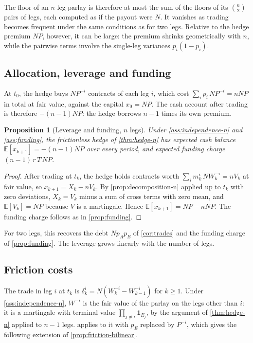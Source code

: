 \documentclass[11pt,a4paper]{article}
\theoremstyle{plain}
\newtheorem{proposition}[theorem]{Proposition}
\theoremstyle{definition}
\theoremstyle{remark}
\newcommand{\E}{\mathbb{E}}
\newcommand{\1}{\mathbf{1}}
\begin{document}
The floor of an $n$-leg parlay is therefore at most the sum of the floors of its $\binom{n}{2}$ pairs of legs, each computed as if the payout were $N$. It vanishes as trading becomes frequent under the same conditions as for two legs. Relative to the hedge premium $NP$, however, it can be large: the premium shrinks geometrically with $n$, while the pairwise terms involve the single-leg variances $p_i(1-p_i)$.

\subsection{Allocation, leverage and funding}

At $t_0$, the hedge buys $NP^{-i}$ contracts of each leg $i$, which cost $\sum_ip_i\,NP^{-i} = nNP$ in total at fair value, against the capital $x_0 = NP$. The cash account after trading is therefore $-(n-1)NP$: the hedge borrows $n-1$ times its own premium.

\begin{proposition}[Leverage and funding, $n$ legs]
\label{prop:funding-n}
Under \cref{ass:independence-n} and \cref{ass:funding}, the frictionless hedge of \cref{thm:hedge-n} has expected cash balance $\E[x_{k+1}] = -(n-1)NP$ over every period, and expected funding charge $(n-1)\,r\,T\,NP$.
\end{proposition}

\begin{proof}
After trading at $t_k$, the hedge holds contracts worth $\sum_i m^i_k\,NW^{-i}_k = nV_k$ at fair value, so $x_{k+1} = X_k - nV_k$. By \cref{prop:decomposition-n} applied up to $t_k$ with zero deviations, $X_k = V_k$ minus a sum of cross terms with zero mean, and $\E[V_k] = NP$ because $V$ is a martingale. Hence $\E[x_{k+1}] = NP - nNP$. The funding charge follows as in \cref{prop:funding}.
\end{proof}

For two legs, this recovers the debt $Np_Ap_B$ of \cref{cor:trades} and the funding charge of \cref{prop:funding}. The leverage grows linearly with the number of legs.

\subsection{Friction costs}

The trade in leg $i$ at $t_k$ is $\delta^i_k = N(W^{-i}_k - W^{-i}_{k-1})$ for $k\geq 1$. Under \cref{ass:independence-n}, $W^{-i}$ is the fair value of the parlay on the legs other than $i$: it is a martingale with terminal value $\prod_{j\neq i}\1_{E_j}$, by the argument of \cref{thm:hedge-n} applied to $n-1$ legs.  applies to it with $p_E$ replaced by $P^{-i}$, which gives the following extension of \cref{prop:friction-bilinear}.
\end{document}

